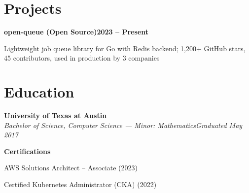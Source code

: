 \documentclass[letterpaper,10pt]{article}
\newcommand{\heading}[2]{
  \hspace{10pt}#1\hfill#2\\
}
\newcommand{\headingBf}[2]{
  \heading{\textbf{#1}}{\textbf{#2}}
}
\newcommand{\headingIt}[2]{
  \heading{\textit{#1}}{\textit{#2}}
}
\newenvironment{resume_list}{
  \vspace{-7pt}
  \begin{itemize}[itemsep=-2px, parsep=1pt, leftmargin=30pt]
}{
  \end{itemize}
}
\begin{document}
  \section{Projects}

  \headingBf{open-queue (Open Source)}{2023 -- Present}
  \begin{resume_list}
    \item Lightweight job queue library for Go with Redis backend; 1,200+ GitHub stars, 45 contributors, used in production by 3 companies
  \end{resume_list}

  \section{Education}

  \headingBf{University of Texas at Austin}{}
  \headingIt{Bachelor of Science, Computer Science --- Minor: Mathematics}{Graduated May 2017}
  \vspace{5pt}
  \headingBf{Certifications}{}
  \begin{resume_list}
    \item AWS Solutions Architect -- Associate (2023)
    \item Certified Kubernetes Administrator (CKA) (2022)
  \end{resume_list}
\end{document}

